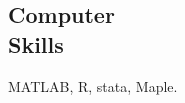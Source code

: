 \documentclass[margin,line]{res}
\newenvironment{list1}{
  \begin{list}{\ding{113}}{%
      \setlength{\itemsep}{0in}
      \setlength{\parsep}{0in} \setlength{\parskip}{0in}
      \setlength{\topsep}{0in} \setlength{\partopsep}{0in} 
      \setlength{\leftmargin}{0.17in}}}{\end{list}}
\begin{document}
\begin{resume}
\section{\sc Computer \\ Skills}  MATLAB, R, stata, Maple.\\
%


\end{resume}
\end{document}
